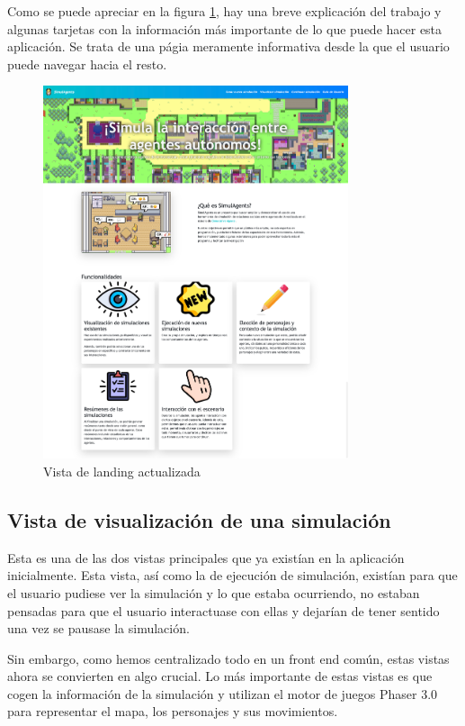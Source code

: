 Como se puede apreciar en la figura \ref{fig:landing}, hay una breve explicación del trabajo y algunas tarjetas con la información más importante de lo que puede hacer esta aplicación. Se trata de una págia meramente informativa desde la que el usuario puede navegar hacia el resto.

\begin{figure}[h]
	\centering
	\includegraphics[width = 0.8\textwidth]{Imagenes/Vectorial/landing.png}
	\caption{Vista de landing actualizada}
	\label{fig:landing}
\end{figure}

\subsection{Vista de visualización de una simulación}
\label{sec:vistaSimulacion}

Esta es una de las dos vistas principales que ya existían en la aplicación inicialmente. Esta vista, así como la de ejecución de simulación, existían para que el usuario pudiese ver la simulación y lo que estaba ocurriendo, no estaban pensadas para que el usuario interactuase con ellas y dejarían de tener sentido una vez se pausase la simulación.

Sin embargo, como hemos centralizado todo en un front end común, estas vistas ahora se convierten en algo crucial. Lo más importante de estas vistas es que cogen la información de la simulación y utilizan el motor de juegos Phaser 3.0 para representar el mapa, los personajes y sus movimientos.

